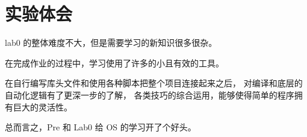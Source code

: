 \section{实验体会}

lab0 的整体难度不大，但是需要学习的新知识很多很杂。

在完成作业的过程中，学习使用了许多的小且有效的工具。

在自行编写库头文件和使用各种脚本把整个项目连接起来之后，
对编译和底层的自动化逻辑有了更深一步的了解，
各类技巧的综合运用，能够使得简单的程序拥有巨大的灵活性。

总而言之，Pre 和 Lab0 给 OS 的学习开了个好头。